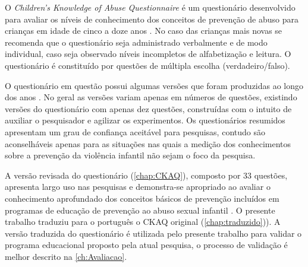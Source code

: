 \vspace{-0.1cm}

O \textit{Children’s Knowledge of Abuse Questionnaire} é um questionário desenvolvido para avaliar os níveis de conhecimento dos conceitos de prevenção de abuso para crianças em idade de cinco a doze anos \cite{tutty1992ability}. No caso das crianças mais novas se recomenda que o questionário seja administrado verbalmente e de modo individual, caso seja observado níveis incompletos de alfabetização e leitura. O questionário é constituído por questões de múltipla escolha (verdadeiro/falso).

\vspace{-0.1cm}

O questionário em questão possui algumas versões que foram produzidas ao longo dos anos \cite{tutty1995revised, tutty2019children}. No geral as versões variam apenas em números de questões, existindo versões do questionário com apenas dez questões, construídas com o intuito de auxiliar o pesquisador e agilizar os experimentos. Os questionários resumidos apresentam um grau de confiança aceitável para pesquisas, contudo são aconselháveis apenas para as situações nas quais a medição dos conhecimentos sobre a prevenção da violência infantil não sejam o foco da pesquisa. 



\vspace{-0.1cm}

A versão revisada do questionário (\autoref{chap:CKAQ}), composto por 33 questões, apresenta largo uso nas pesquisas e demonstra-se apropriado ao avaliar o conhecimento aprofundado dos conceitos básicos de prevenção incluídos em programas de educação de prevenção ao abuso sexual infantil \cite{tutty1992ability}. O presente trabalho traduziu para o português o CKAQ original (\autoref{chap:traduzido})). A versão traduzida do questionário é utilizada pelo presente trabalho para validar o programa educacional proposto pela atual pesquisa, o processo de validação é melhor descrito na \autoref{ch:Avaliacao}.



